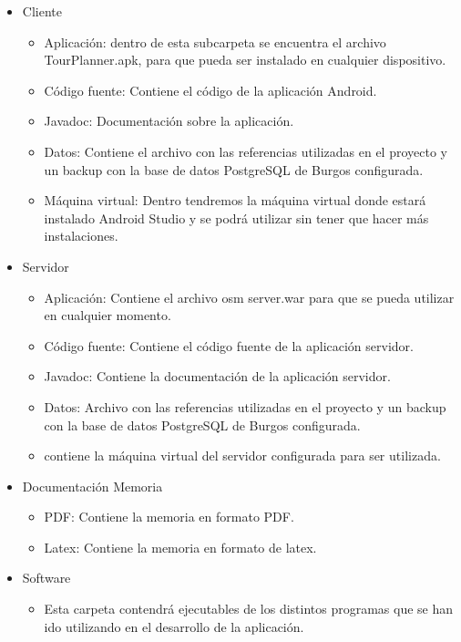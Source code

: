 \begin{itemize}
\item Cliente
 	\begin{itemize}
		\item Aplicación: dentro de esta subcarpeta se encuentra el archivo TourPlanner.apk, para que pueda ser instalado en cualquier dispositivo.
		\item Código fuente: Contiene el código de la aplicación Android.
		\item Javadoc: Documentación sobre la aplicación.
		\item Datos: Contiene el archivo con las referencias utilizadas en el proyecto y un backup con la base de datos PostgreSQL de Burgos configurada.
		\item Máquina virtual: Dentro tendremos la máquina virtual donde estará instalado Android Studio y se podrá utilizar sin tener que hacer más instalaciones.
		\end{itemize}
		
\item Servidor
 	\begin{itemize}
		\item Aplicación: Contiene el archivo osm server.war para que se pueda utilizar en cualquier momento.
		\item Código fuente: Contiene el código fuente de la aplicación servidor.
		\item Javadoc: Contiene la documentación de la aplicación servidor.
		\item Datos: Archivo con las referencias utilizadas en el proyecto y un backup con la base de datos PostgreSQL de Burgos configurada.
		\item contiene la máquina virtual del servidor configurada para ser utilizada.
		\end{itemize}
		
\item Documentación Memoria
 	\begin{itemize}	
		\item PDF: Contiene la memoria en formato PDF.
		\item Latex: Contiene la memoria en formato de latex.
		\end{itemize}
		
\item Software
 	\begin{itemize}
		\item Esta carpeta contendrá ejecutables de los distintos programas que se han ido utilizando en el desarrollo de la aplicación.
		\end{itemize}		
\end{itemize}

